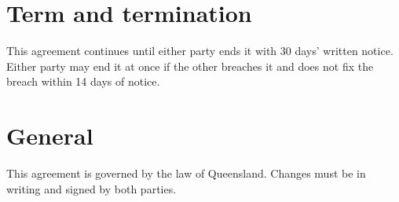 \documentclass{jupiter-agreement}
\begin{document}
\section{Term and termination}
\clause This agreement continues until either party ends it with 30 days' written notice.
\clause Either party may end it at once if the other breaches it and does not fix the breach within 14 days of notice.

\section{General}
\clause This agreement is governed by the law of Queensland.
\clause Changes must be in writing and signed by both parties.

\end{document}
